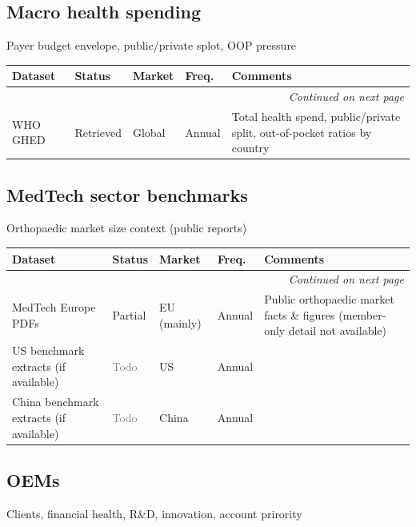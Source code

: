 \documentclass{article}
\begin{document}
\subsection{Macro health spending}
Payer budget envelope, public/private splot, OOP pressure\\[0.5em]

\small
\setlength{\tabcolsep}{4pt}
\renewcommand{\arraystretch}{1.15}
\begin{longtable}{@{}p{3.0cm}p{2.0cm}p{2.1cm}p{1.9cm}p{5.8cm}@{}}
\toprule
\textbf{Dataset} & \textbf{Status} & \textbf{Market} & \textbf{Freq.} & \textbf{Comments} \\
\midrule
\endhead
\midrule
\multicolumn{5}{r}{\textit{Continued on next page}} \\
\endfoot
\bottomrule
\endlastfoot
WHO GHED & \textcolor{green!60!black}{Retrieved} & Global & Annual & Total health spend, public/private split, out-of-pocket ratios by country \\
\end{longtable}
\normalsize

\subsection{MedTech sector benchmarks}
Orthopaedic market size context (public reports)\\[0.5em]

\small
\setlength{\tabcolsep}{4pt}
\renewcommand{\arraystretch}{1.15}
\begin{longtable}{@{}p{3.0cm}p{2.0cm}p{2.1cm}p{1.9cm}p{5.8cm}@{}}
\toprule
\textbf{Dataset} & \textbf{Status} & \textbf{Market} & \textbf{Freq.} & \textbf{Comments} \\
\midrule
\endhead
\midrule
\multicolumn{5}{r}{\textit{Continued on next page}} \\
\endfoot
\bottomrule
\endlastfoot
MedTech Europe PDFs & \textcolor{orange!85!black}{Partial} & EU (mainly) & Annual & Public orthopaedic market facts \& figures (member-only detail not available) \\
US benchmark extracts (if available) & \textcolor{gray}{Todo} & US & Annual &  \\
China benchmark extracts (if available) & \textcolor{gray}{Todo} & China & Annual &  \\
\end{longtable}
\normalsize

\subsection{OEMs}
Clients, financial health, R\&D, innovation, account prirority\\[0.5em]
\end{document}
